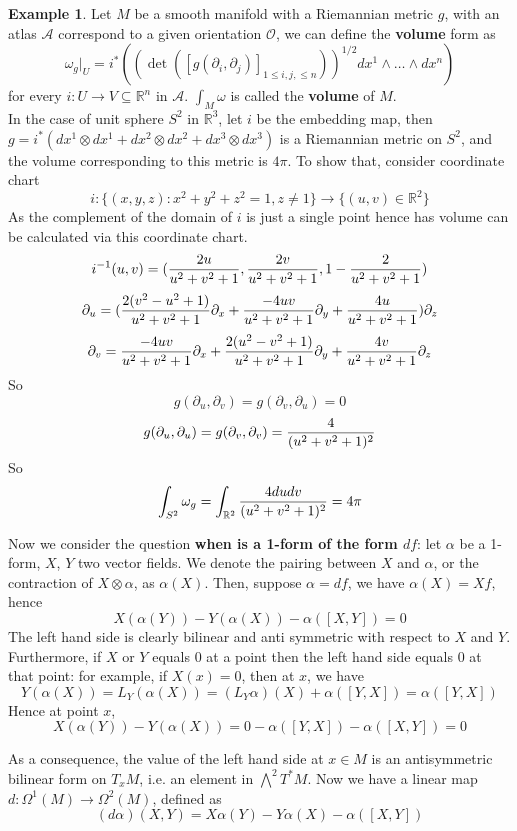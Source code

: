\documentclass{article}
\theoremstyle{definition}
\newtheorem{exm}[thm]{Example}
\begin{document}
\begin{exm}
    Let $M$ be a smooth manifold with a Riemannian metric $g$, with an atlas $\mathcal{A}$ correspond to a given orientation $\mathcal{O}$, we can define the {\bf volume} form as
    \[\omega_g|_U=i^*((\det([g(\partial_i, \partial_j)]_{1\leq i, j, \leq n}))^{1/2}dx^1\wedge \dots \wedge dx^n)\]
    for every $i: U\rightarrow V\subseteq\mathbb{R}^n$ in $\mathcal{A}$. $\int_M \omega$ is called the {\bf volume} of $M$.\\

    In the case of unit sphere $S^2$ in $\mathbb{R}^3$, let $i$ be the embedding map, then $g=i^*(dx^1\otimes dx^1+dx^2\otimes dx^2+dx^3\otimes dx^3)$ is a Riemannian metric on $S^2$, and the volume corresponding to this metric is $4\pi$. To show that, consider coordinate chart 
    \[i: \{(x, y, z): x^2+y^2+z^2=1, z\not=1\}\rightarrow \{(u, v)\in \mathbb{R}^2\}\]
    As the complement of the domain of $i$ is just a single point hence has volume can be calculated via this coordinate chart.\\

    \[i^{-1}(u, v)=({2u\over u^2+v^2+1}, {2v\over u^2+v^2+1}, 1-{2\over u^2+v^2+1})\]
    \[\partial_u=({2(v^2-u^2+1)\over u^2+v^2+1}\partial_x+ {-4uv\over u^2+v^2+1}\partial_y+{4u\over u^2+v^2+1})\partial_z\]
    \[\partial_v={-4uv\over u^2+v^2+1}\partial_x+ {2(u^2-v^2+1)\over u^2+v^2+1}\partial_y+{4v\over u^2+v^2+1}\partial_z\]
    So 
    \[g(\partial_u, \partial_v)=g(\partial_v, \partial_u)=0\]
    \[g(\partial_u, \partial_u)=g(\partial_v, \partial_v)={4\over (u^2+v^2+1)^2}\]
    So
    \[\int_{S^2}\omega_g=\int_{\mathbb{R}^2}{4dudv\over (u^2+v^2+1)^2}=4\pi\]
\end{exm}

Now we consider the question {\bf when is a 1-form of the form $df$}: let $\alpha$ be a 1-form, $X$, $Y$ two vector fields. We denote the pairing between $X$ and $\alpha$, or the contraction of $X\otimes \alpha$, as $\alpha(X)$. Then, suppose $\alpha=df$, we have $\alpha(X)=Xf$, hence
\[X(\alpha(Y))-Y(\alpha(X))-\alpha([X, Y])=0\]
The left hand side is clearly bilinear and anti symmetric with respect to $X$ and $Y$. Furthermore, if $X$ or $Y$ equals $0$ at a point then the left hand side equals $0$ at that point: for example, if $X(x)=0$, then at $x$, we have
\[Y(\alpha(X))=L_Y(\alpha(X))=(L_Y\alpha)(X)+\alpha([Y, X])=\alpha([Y, X])\]
Hence at point $x$,
\[X(\alpha(Y))-Y(\alpha(X))=0-\alpha([Y, X])-\alpha([X, Y])=0\]

 As a consequence, the value of the left hand side at $x\in M$ is an antisymmetric bilinear form on $T_xM$, i.e. an element in $\bigwedge^2 T^*M$. Now we have a linear map $d: \Omega^1(M)\rightarrow \Omega^2(M)$, defined as
\[(d\alpha)(X, Y)=X\alpha(Y)-Y\alpha(X)-\alpha([X, Y])\]
\end{document}
